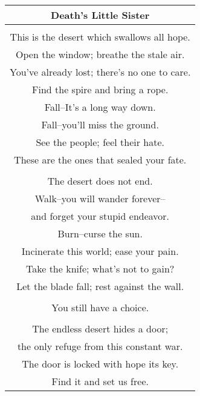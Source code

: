 \documentclass{article}
\begin{document}
\begin{center}
\begin{tabular}{c}
\textbf{Death's Little Sister} \\ \hline
\\
This is the desert which swallows all hope. \\
Open the window; breathe the stale air. \\
You've already lost; there's no one to care. \\
Find the spire and bring a rope. \\
Fall--It's a long way down. \\
Fall--you'll miss the ground. \\
See the people; feel their hate. \\
These are the ones that sealed your fate. \\
\\
The desert does not end. \\
Walk--you will wander forever-- \\
and forget your stupid endeavor. \\
Burn--curse the sun. \\
Incinerate this world; ease your pain. \\
Take the knife; what's not to gain? \\
Let the blade fall; rest against the wall. \\
\\
You still have a choice. \\
\\
The endless desert hides a door; \\
the only refuge from this constant war. \\
The door is locked with hope its key. \\
Find it and set us free. \\
\end{tabular}
\end{center}
\end{document}
